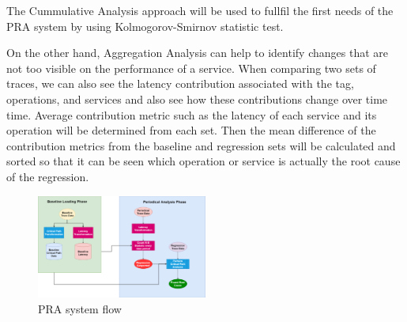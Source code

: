 \documentclass[conference]{configs/IEEEtran}
\begin{document}
The Cummulative Analysis approach will be used to fullfil the first needs of the PRA system by using Kolmogorov-Smirnov statistic test.

On the other hand, Aggregation Analysis can help to identify changes that are not too visible on the performance of a service. When comparing two sets of traces, we can also see the latency contribution associated with the tag,
operations, and services and also see how these contributions change over time time. Average contribution metric
such as the latency of each service and its operation will be determined from each set. Then the mean difference of the contribution metrics from the baseline and regression sets
will be calculated and sorted so that it can be seen which operation or service is actually the root cause of the regression.




\begin{figure}[!htb]
	\centering
	\includegraphics[width=0.5\textwidth,scale=5]{resources/ch3/alur_v2.png}
	\caption{PRA system flow}
	\label{flow-pra}
\end{figure}
\end{document}
